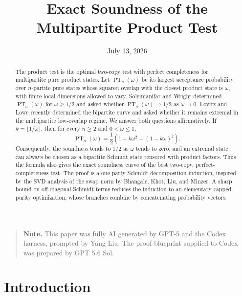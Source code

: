 \documentclass[11pt]{article}
\title{Exact Soundness of the Multipartite Product Test}
\author{}
\date{July 13, 2026}
\theoremstyle{definition}
\theoremstyle{remark}
\newcommand{\PT}{\operatorname{PT}}
\begin{document}
\maketitle

\begin{abstract}
The product test is the optimal two-copy test with perfect completeness for
multipartite pure product states.  Let $\PT_n(\omega)$ be its largest
acceptance probability over $n$-partite pure states whose squared overlap
with the closest product state is $\omega$, with finite local dimensions
allowed to vary.  Soleimanifar and Wright determined $\PT_n(\omega)$ for
$\omega\geq 1/2$ and asked whether $\PT_n(\omega)\to1/2$ as
$\omega\to0$.  Lovitz and Lowe recently determined the bipartite curve and
asked whether it remains extremal in the multipartite low-overlap regime.
We answer both questions affirmatively.  If
$k=\lfloor 1/\omega\rfloor$, then for every $n\geq2$ and
$0<\omega\leq1$,
\[
  \PT_n(\omega)
  =\frac12\left(1+k\omega^2+(1-k\omega)^2\right).
\]
Consequently, the soundness tends to $1/2$ as $\omega$ tends to zero, and
an extremal state can always be chosen as a bipartite Schmidt state tensored
with product factors.  Thus the formula also gives the exact soundness curve
of the best two-copy, perfect-completeness test.  The proof is a one-party
Schmidt-decomposition induction, inspired by the SVD analysis of the swap
norm by Bhangale, Khot, Liu, and Minzer.  A sharp bound on off-diagonal
Schmidt terms reduces the induction to an elementary capped-purity
optimization, whose branches combine by concatenating probability vectors.
\end{abstract}

\begin{quote}
\small\noindent\textbf{Note.} This paper was fully AI generated by GPT-5
and the Codex harness, prompted by Yang Liu.  The proof blueprint supplied
to Codex was prepared by GPT 5.6 Sol.
\end{quote}

\section{Introduction}
\end{document}
